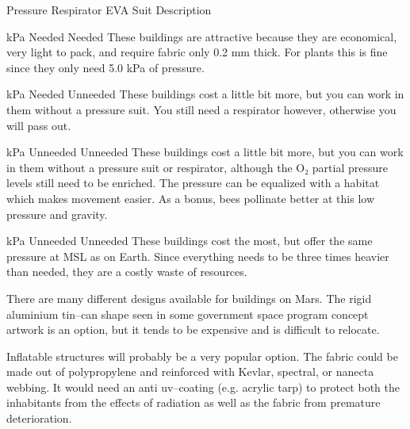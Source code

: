 \crlf
\crlf
{}
{
    \bTABLE[split=repeat,option=stretch]
    \setupTABLE[column][4][
        width=.50\textwidth,
        align=yes]
    \setupTABLE[row][each][align=center]
    \setupTABLE[4][1][align=center]

    \bTABLEhead
    \bTR[bottomframe=on]
      \bTH  Pressure \eTH
      \bTH  Respirator \eTH
      \bTH  EVA Suit \eTH
      \bTH  Description \eTH
    \eTR
    \eTABLEhead

    \bTABLEbody
    \bTR
       kPa \eTC
      \bTC Needed \eTC
      \bTC Needed \eTC
      \bTC These buildings are attractive because they are economical, very light to pack, and require fabric only 0.2 mm thick. For plants this is fine since they only need 5.0 kPa of pressure. \eTC
    \eTR

    \bTR
       kPa \eTC
      \bTC Needed \eTC
      \bTC Unneeded \eTC
      \bTC These buildings cost a little bit more, but you can work in them without a pressure suit. You still need a respirator however, otherwise you will pass out. \eTC
    \eTR

    \bTR
       kPa \eTC
      \bTC Unneeded \eTC
      \bTC Unneeded \eTC
      \bTC These buildings cost a little bit more, but you can work in them without a pressure suit or respirator, although the O₂ partial pressure levels still need to be enriched. The pressure can be equalized with a habitat which makes movement easier. As a bonus, bees pollinate better at this low pressure and gravity. \eTC
    \eTR

    \bTR
       kPa \eTC
      \bTC Unneeded \eTC
      \bTC Unneeded \eTC
      \bTC These buildings cost the most, but offer the same pressure at MSL as on Earth. Since everything needs to be three times heavier than needed, they are a costly waste of resources. \eTC
    \eTR
    \eTABLEbody

\eTABLE
}

There are many different designs available for buildings on Mars. The rigid aluminium tin--can shape seen in some government space program concept artwork is an option, but it tends to be expensive and is difficult to relocate.

Inflatable structures will probably be a very popular option. The fabric could be made out of polypropylene and reinforced with Kevlar, spectral, or nanecta webbing. It would need an anti uv--coating (e.g. acrylic tarp) to protect both the inhabitants from the effects of radiation as well as the fabric from premature deterioration.

